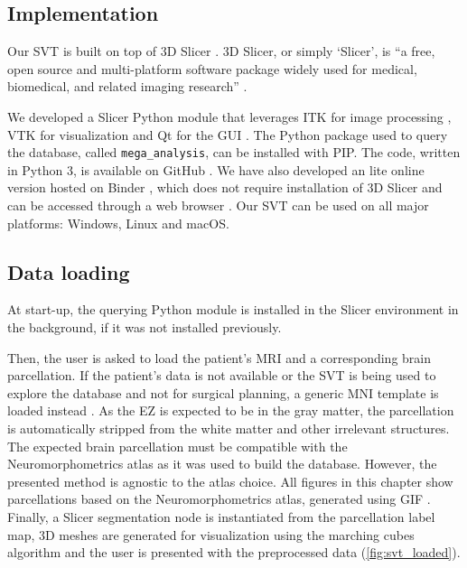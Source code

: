 \subsection{Implementation}
\label{sec:svt_implementation}

Our \ac{SVT} is built on top of 3D Slicer \cite{fedorov_3d_2012}.
3D Slicer, or simply `Slicer', is ``a free, open source and multi-platform software package widely used for medical, biomedical, and related imaging research''%
.

We developed a Slicer Python module that leverages \ac{ITK} for image processing \cite{mccormick_itk_2014}, \ac{VTK} for visualization \cite{schroeder_visualization_2006} and Qt for the \ac{GUI}%
.
The Python package used to query the \svtdatabase database, called \texttt{mega\_analysis}, can be installed with \ac{PIP}.
The code, written in Python 3, is available on GitHub%
\fnurl{\svtgithub}.
We have also developed an lite online version hosted on Binder \cite{bussonnier_binder_2018}, which does not require installation of 3D Slicer and can be accessed through a web browser%
\fnurl{\svtweb}.
Our \ac{SVT} can be used on all major platforms: Windows, Linux and macOS.


\subsection{Data loading}
\label{sec:svt_loading}

At start-up, the querying Python module is installed in the Slicer environment in the background, if it was not installed previously.

Then, the user is asked to load the patient's \ac{MRI} and a corresponding brain parcellation.
If the patient's data is not available or the \ac{SVT} is being used to explore the database and not for surgical planning, a generic \ac{MNI} template is loaded instead \cite{fonov_unbiased_2009}.
As the \ac{EZ} is expected to be in the gray matter, the parcellation is automatically stripped from the white matter and other irrelevant structures.
The expected brain parcellation must be compatible with the Neuromorphometrics atlas as it was used to build the \svtdatabase database.
However, the presented method is agnostic to the atlas choice.
All figures in this chapter show parcellations based on the Neuromorphometrics atlas, generated using \ac{GIF} \cite{cardoso_geodesic_2015}.
Finally, a Slicer segmentation node is instantiated from the parcellation label map, 3D meshes are generated for visualization using the marching cubes algorithm \cite{lorensen_marching_1987,pinter_polymorph_2019} and the user is presented with the preprocessed data (\cref{fig:svt_loaded}).

